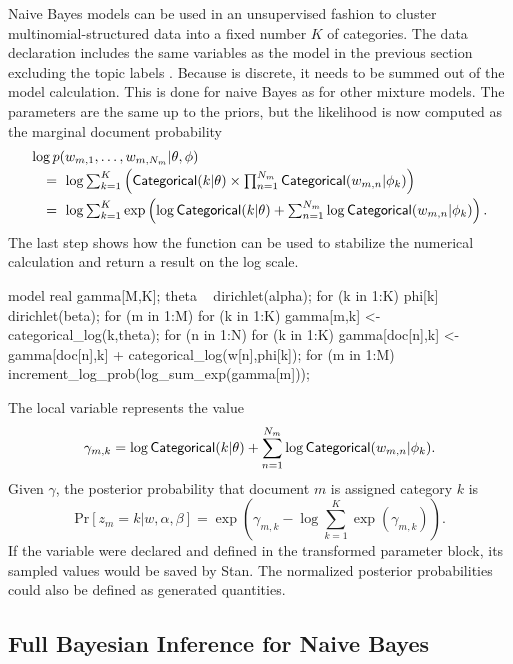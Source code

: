 Naive Bayes models can be used in an unsupervised fashion to cluster
multinomial-structured data into a fixed number $K$ of categories.  
The data declaration includes the same variables as the model in the
previous section excluding the topic labels .   Because
 is discrete, it needs to be summed out of the model
calculation.  This is done for naive Bayes as for other mixture
models.  The parameters are the same up to the priors, but the
likelihood is now computed as the marginal document probability
\[
\begin{array}{l}
\log p(w_{m,1},\ldots,w_{m,N_m}|\theta,\phi)
\\[2pt]
\ \ \ = \ 
\log \sum_{k=1}^K 
\left( \distro{Categorical}(k|\theta)
        \times \prod_{n=1}^{N_m} \distro{Categorical}(w_{m,n}|\phi_k)
\right)
\\[6pt]
\ \ \ = \ 
\log \sum_{k=1}^K \exp \left(
\log \distro{Categorical}(k|\theta)
+ \sum_{n=1}^{N_m} \log \distro{Categorical}(w_{m,n}|\phi_k)
\right).
\end{array}
\]
%
The last step shows how the  function can be used
to stabilize the numerical calculation and return a result on the log
scale.
%
\begin{stancode}
model {
  real gamma[M,K];
  theta ~ dirichlet(alpha);
  for (k in 1:K)
    phi[k] ~ dirichlet(beta);
  for (m in 1:M) 
    for (k in 1:K) 
      gamma[m,k] <- categorical_log(k,theta);
  for (n in 1:N)
    for (k in 1:K)
      gamma[doc[n],k] <- gamma[doc[n],k] 
                         + categorical_log(w[n],phi[k]);
  for (m in 1:M)
    increment_log_prob(log_sum_exp(gamma[m]));
}
\end{stancode}
%
The local variable  represents the value
\[
\gamma_{m,k} = \log \distro{Categorical}(k|\theta)
+ \sum_{n=1}^{N_m} \log \distro{Categorical}(w_{m,n}|\phi_k).
\]
%
Given $\gamma$, the posterior probability that document
$m$ is assigned category $k$ is
\[
\mbox{Pr}[z_m = k|w,\alpha,\beta]
=
\exp \left( 
\gamma_{m,k}
- \log \sum_{k=1}^K \exp \left( \gamma_{m,k} \right)
\right).
\]
%
If the variable  were declared and defined in the
transformed parameter block, its sampled values would be saved by
Stan.  The normalized posterior probabilities could also be defined as
generated quantities.

\subsection{Full Bayesian Inference for Naive Bayes}

